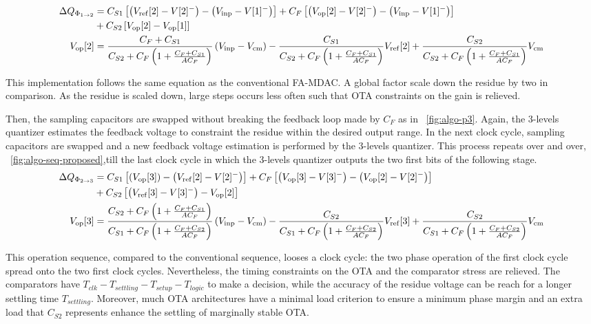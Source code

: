 \begin{align}
 \Delta Q_{\Phi_{1 \rightarrow 2}} &= C_{S1} \left[\left(V_{\rm ref}[2]-V[2]^- \right) - \left(V_{\rm inp}-V[1]^- \right) \right] + C_{F} \left[\left(V_{\rm op}[2]-V[2]^- \right) - \left(V_{\rm inp}-V[1]^- \right) \right] \\
 &+ C_{S2} \left[V_{\rm op}[2]-V_{\rm op}[1] \right] \nonumber \\
 V_{\rm op}[2] &= \frac{C_F + C_{S1}}{C_{S2}+C_F\left(1+\frac{C_F+C_{S1}}{AC_F} \right)} \left(V_{\rm inp}-V_{\rm cm} \right) - \frac{C_{S1}}{C_{S2}+C_F\left(1+\frac{C_F+C_{S1}}{AC_F} \right)} V_{\rm ref}[2] + \frac{C_{S2}}{C_{S2}+C_F\left(1+\frac{C_F+C_{S1}}{AC_F} \right)} V_{\rm cm}
 \label{eqn:algo_res_p2}
\end{align}

This implementation follows the same equation as the conventional FA-MDAC\@. A global factor scale down the residue by two in comparison. As the residue is scaled down, large steps occurs less often such that OTA constraints on the gain is relieved.

Then, the sampling capacitors are swapped without breaking the feedback loop made by \(C_F\) as in \figurename~\ref{fig:algo-p3}. Again, the 3-levels quantizer estimates the feedback voltage to constraint the residue within the desired output range. In the next clock cycle, sampling capacitors are swapped and a new feedback voltage estimation is performed by the 3-levels quantizer. This process repeats over and over, \figurename~\ref{fig:algo-seq-proposed},till the last clock cycle in which the 3-levels quantizer outputs the two first bits of the following stage.
\rm 
\begin{align}
	\Delta Q_{\Phi_{2 \rightarrow 3}} &= C_{S1} \left[\left(V_{\rm op}[3] \right) - \left(V_{\rm ref}[2]-V[2]^- \right) \right] + C_{F} \left[\left(V_{\rm op}[3]-V[3]^- \right) - \left(V_{\rm op}[2]-V[2]^- \right) \right] \\
	&+ C_{S2} \left[\left(V_{\rm ref}[3] - V[3]^- \right) - V_{\rm op}[2] \right] \nonumber \\
	V_{\rm op}[3] &= \frac{C_{S2}+C_F\left(1+\frac{C_F+C_{S1}}{AC_F} \right)}{C_{S1}+C_F\left(1+\frac{C_F+C_{S2}}{AC_F} \right)} \left(V_{\rm inp}-V_{\rm cm} \right) - \frac{C_{S2}}{C_{S1}+C_F\left(1+\frac{C_F+C_{S2}}{AC_F} \right)} V_{\rm ref}[3] + \frac{C_{S2}}{C_{S1}+C_F\left(1+\frac{C_F+C_{S2}}{AC_F} \right)} V_{\rm cm}
	\label{eqn:algo_res_p3}
   \end{align}

This operation sequence, compared to the conventional sequence, looses a clock cycle: the two phase operation of the first clock cycle spread onto the two first clock cycles. Nevertheless, the timing constraints on the OTA and the comparator stress are relieved. The comparators have \(T_{clk}-T_{settling}-T_{setup}-T_{logic}\) to make a decision, while the accuracy of the residue voltage can be reach for a longer settling time \(T_{settling}\). Moreover, much OTA architectures have a minimal load criterion to ensure a minimum phase margin and an extra load that \(C_{S2}\) represents enhance the settling of marginally stable OTA\@.

